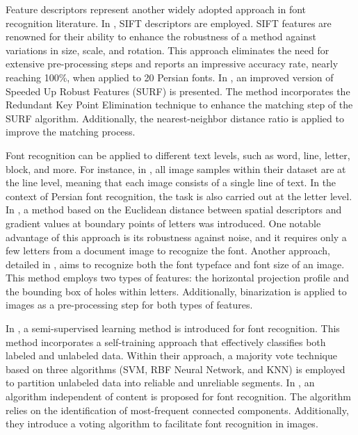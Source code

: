 \documentclass[conference]{IEEEtran}
\begin{document}
Feature descriptors represent another widely adopted approach in font recognition literature.
In \cite{5}, SIFT descriptors are employed. SIFT features are renowned for their ability to enhance the robustness of a method against variations in size, scale, and rotation. This approach eliminates the need for extensive pre-processing steps and reports an impressive accuracy rate, nearly reaching 100\%, when applied to 20 Persian fonts.
In \cite{12}, an improved version of Speeded Up Robust Features (SURF) is presented. The method incorporates the Redundant Key Point Elimination technique to enhance the matching step of the SURF algorithm. Additionally, the nearest-neighbor distance ratio is applied to improve the matching process.

Font recognition can be applied to different text levels, such as word, line, letter, block, and more. For instance, in \cite{8}, all image samples within their dataset are at the line level, meaning that each image consists of a single line of text. In the context of Persian font recognition, the task is also carried out at the letter level.
In \cite{6}, a method based on the Euclidean distance between spatial descriptors and gradient values at boundary points of letters was introduced. One notable advantage of this approach is its robustness against noise, and it requires only a few letters from a document image to recognize the font.
Another approach, detailed in \cite{4}, aims to recognize both the font typeface and font size of an image. This method employs two types of features: the horizontal projection profile and the bounding box of holes within letters. Additionally, binarization is applied to images as a pre-processing step for both types of features.

In \cite{7}, a semi-supervised learning method is introduced for font recognition. This method incorporates a self-training approach that effectively classifies both labeled and unlabeled data.
Within their approach, a majority vote technique based on three algorithms (SVM, RBF Neural Network, and KNN) is employed to partition unlabeled data into reliable and unreliable segments.
In \cite{9}, an algorithm independent of content is proposed for font recognition. The algorithm relies on the identification of most-frequent connected components. Additionally, they introduce a voting algorithm to facilitate font recognition in images.
\end{document}
